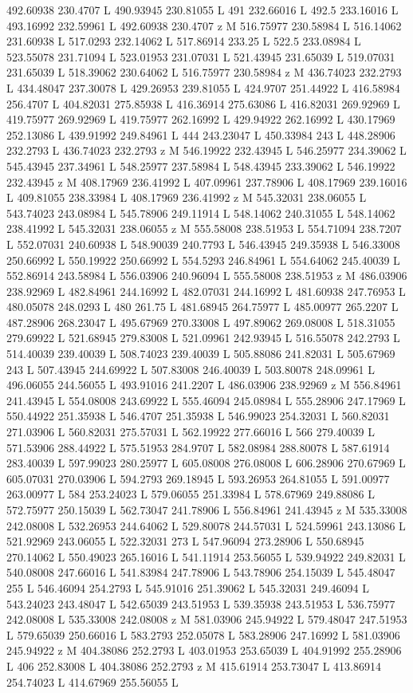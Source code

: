 {\begin{scope}[local bounding box=bb]
{492.60938 230.4707 L 490.93945 230.81055 L 491 232.66016 L 492.5 233.16016 L 493.16992 232.59961 L 492.60938 230.4707 z M 516.75977 230.58984 L 516.14062 231.60938 L 517.0293 232.14062 L 517.86914 233.25 L 522.5 233.08984 L 523.55078 231.71094 L 523.01953 231.07031 L 521.43945 231.65039 L 519.07031 231.65039 L 518.39062 230.64062 L 516.75977 230.58984 z M 436.74023 232.2793 L 434.48047 237.30078 L 429.26953 239.81055 L 424.9707 251.44922 L 416.58984 256.4707 L 404.82031 275.85938 L 416.36914 275.63086 L 416.82031 269.92969 L 419.75977 269.92969 L 419.75977 262.16992 L 429.94922 262.16992 L 430.17969 252.13086 L 439.91992 249.84961 L 444 243.23047 L 450.33984 243 L 448.28906 232.2793 L 436.74023 232.2793 z M 546.19922 232.43945 L 546.25977 234.39062 L 545.43945 237.34961 L 548.25977 237.58984 L 548.43945 233.39062 L 546.19922 232.43945 z M 408.17969 236.41992 L 407.09961 237.78906 L 408.17969 239.16016 L 409.81055 238.33984 L 408.17969 236.41992 z M 545.32031 238.06055 L 543.74023 243.08984 L 545.78906 249.11914 L 548.14062 240.31055 L 548.14062 238.41992 L 545.32031 238.06055 z M 555.58008 238.51953 L 554.71094 238.7207 L 552.07031 240.60938 L 548.90039 240.7793 L 546.43945 249.35938 L 546.33008 250.66992 L 550.19922 250.66992 L 554.5293 246.84961 L 554.64062 245.40039 L 552.86914 243.58984 L 556.03906 240.96094 L 555.58008 238.51953 z M 486.03906 238.92969 L 482.84961 244.16992 L 482.07031 244.16992 L 481.60938 247.76953 L 480.05078 248.0293 L 480 261.75 L 481.68945 264.75977 L 485.00977 265.2207 L 487.28906 268.23047 L 495.67969 270.33008 L 497.89062 269.08008 L 518.31055 279.69922 L 521.68945 279.83008 L 521.09961 242.93945 L 516.55078 242.2793 L 514.40039 239.40039 L 508.74023 239.40039 L 505.88086 241.82031 L 505.67969 243 L 507.43945 244.69922 L 507.83008 246.40039 L 503.80078 248.09961 L 496.06055 244.56055 L 493.91016 241.2207 L 486.03906 238.92969 z M 556.84961 241.43945 L 554.08008 243.69922 L 555.46094 245.08984 L 555.28906 247.17969 L 550.44922 251.35938 L 546.4707 251.35938 L 546.99023 254.32031 L 560.82031 271.03906 L 560.82031 275.57031 L 562.19922 277.66016 L 566 279.40039 L 571.53906 288.44922 L 575.51953 284.9707 L 582.08984 288.80078 L 587.61914 283.40039 L 597.99023 280.25977 L 605.08008 276.08008 L 606.28906 270.67969 L 605.07031 270.03906 L 594.2793 269.18945 L 593.26953 264.81055 L 591.00977 263.00977 L 584 253.24023 L 579.06055 251.33984 L 578.67969 249.88086 L 572.75977 250.15039 L 562.73047 241.78906 L 556.84961 241.43945 z M 535.33008 242.08008 L 532.26953 244.64062 L 529.80078 244.57031 L 524.59961 243.13086 L 521.92969 243.06055 L 522.32031 273 L 547.96094 273.28906 L 550.68945 270.14062 L 550.49023 265.16016 L 541.11914 253.56055 L 539.94922 249.82031 L 540.08008 247.66016 L 541.83984 247.78906 L 543.78906 254.15039 L 545.48047 255 L 546.46094 254.2793 L 545.91016 251.39062 L 545.32031 249.46094 L 543.24023 243.48047 L 542.65039 243.51953 L 539.35938 243.51953 L 536.75977 242.08008 L 535.33008 242.08008 z M 581.03906 245.94922 L 579.48047 247.51953 L 579.65039 250.66016 L 583.2793 252.05078 L 583.28906 247.16992 L 581.03906 245.94922 z M 404.38086 252.2793 L 403.01953 253.65039 L 404.91992 255.28906 L 406 252.83008 L 404.38086 252.2793 z M 415.61914 253.73047 L 413.86914 254.74023 L 414.67969 255.56055 L }
\end{scope}}
